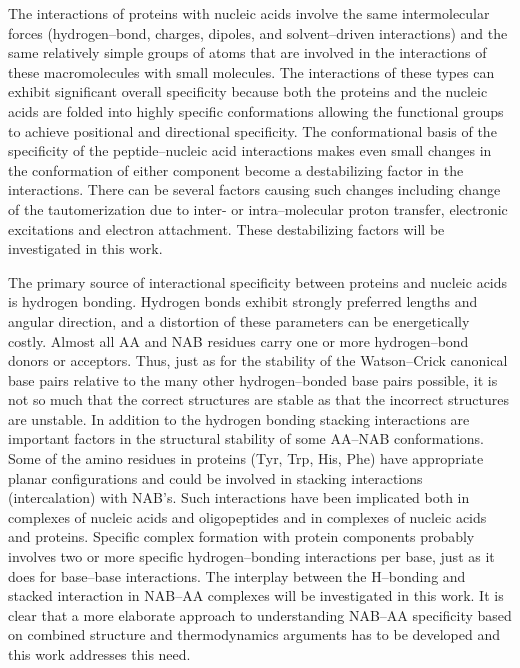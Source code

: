 The interactions of proteins with nucleic acids involve the 
same intermolecular forces (hydrogen--bond, charges, dipoles,
and solvent--driven interactions) and the same relatively simple
groups of atoms that are involved in the interactions of these
macromolecules with small molecules. The interactions of these
types can exhibit significant overall specificity because both
the proteins and the nucleic acids are folded into highly specific
conformations allowing the functional groups to achieve
positional and directional specificity.
The conformational basis of the specificity of the peptide--nucleic
acid interactions makes even small changes in the conformation of
either component become a destabilizing factor in the interactions.
There can be several factors causing such changes including
change of the tautomerization due to inter- or intra--molecular
proton transfer, electronic excitations and electron attachment.
These destabilizing factors will be investigated in this work.


The primary source of interactional specificity between proteins and
nucleic acids is hydrogen bonding. Hydrogen bonds exhibit strongly
preferred lengths and angular direction, and a distortion of these
parameters can be energetically costly. 
Almost all AA and NAB 
residues carry one or more hydrogen--bond donors or acceptors.
Thus, just as for the stability of the Watson--Crick canonical base 
pairs relative to the many other hydrogen--bonded base pairs 
possible, it is not so much that the correct structures are 
stable as that the incorrect structures are unstable.
In addition to the hydrogen bonding stacking interactions are 
important factors in the structural stability of some AA--NAB 
conformations. Some of the amino residues in
proteins (Tyr, Trp, His, Phe) have appropriate planar configurations 
and could be involved in stacking interactions (intercalation)
with NAB's. Such interactions have been implicated
both in complexes of nucleic acids and oligopeptides\cite{b1}
and in complexes of nucleic acids and proteins.\cite{b2}
Specific complex formation with protein components probably
involves two or more specific hydrogen--bonding interactions
per base, just as it does for base--base interactions.
The interplay between the H--bonding and stacked interaction
in NAB--AA complexes will be investigated in this work.
It is clear that a more elaborate approach to understanding NAB--AA
specificity based on combined structure and thermodynamics arguments
has to be developed and this work addresses this need.


